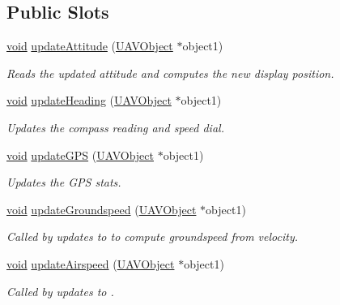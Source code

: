 \subsection*{Public Slots}
\begin{DoxyCompactItemize}
\item 
\hyperlink{group___u_a_v_objects_plugin_ga444cf2ff3f0ecbe028adce838d373f5c}{void} \hyperlink{group___o_p_map_plugin_ga3cedb8f54fcd0c4662e91b56c6043fc2}{update\-Attitude} (\hyperlink{class_u_a_v_object}{U\-A\-V\-Object} $\ast$object1)
\begin{DoxyCompactList}\small\item\em Reads the updated attitude and computes the new display position. \end{DoxyCompactList}\item 
\hyperlink{group___u_a_v_objects_plugin_ga444cf2ff3f0ecbe028adce838d373f5c}{void} \hyperlink{group___o_p_map_plugin_ga4d4bf76026c83f20e97e02adb4cf46f7}{update\-Heading} (\hyperlink{class_u_a_v_object}{U\-A\-V\-Object} $\ast$object1)
\begin{DoxyCompactList}\small\item\em Updates the compass reading and speed dial. \end{DoxyCompactList}\item 
\hyperlink{group___u_a_v_objects_plugin_ga444cf2ff3f0ecbe028adce838d373f5c}{void} \hyperlink{group___o_p_map_plugin_ga469cc6075704bce32507f7561422a3ff}{update\-G\-P\-S} (\hyperlink{class_u_a_v_object}{U\-A\-V\-Object} $\ast$object1)
\begin{DoxyCompactList}\small\item\em Updates the G\-P\-S stats. \end{DoxyCompactList}\item 
\hyperlink{group___u_a_v_objects_plugin_ga444cf2ff3f0ecbe028adce838d373f5c}{void} \hyperlink{group___o_p_map_plugin_gafcdd8249475fe6543b75829cdc19b279}{update\-Groundspeed} (\hyperlink{class_u_a_v_object}{U\-A\-V\-Object} $\ast$object1)
\begin{DoxyCompactList}\small\item\em Called by updates to  to compute groundspeed from velocity. \end{DoxyCompactList}\item 
\hyperlink{group___u_a_v_objects_plugin_ga444cf2ff3f0ecbe028adce838d373f5c}{void} \hyperlink{group___o_p_map_plugin_gac2bff4b3471fe9c088578d0d274716c6}{update\-Airspeed} (\hyperlink{class_u_a_v_object}{U\-A\-V\-Object} $\ast$object1)
\begin{DoxyCompactList}\small\item\em Called by updates to . \end{DoxyCompactList}\item 

\end{DoxyCompactItemize}
